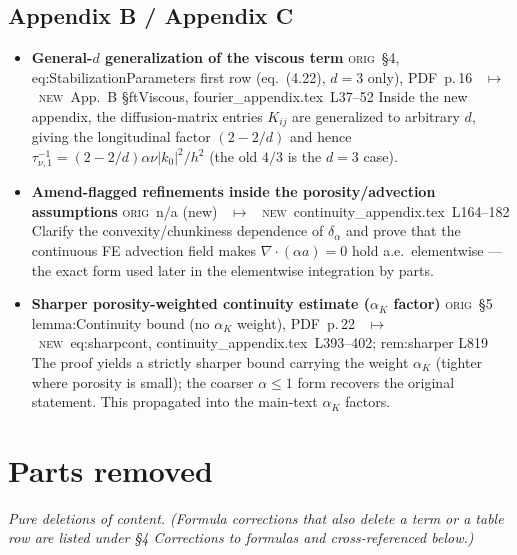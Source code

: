 \documentclass[11pt]{article}
\newcommand{\Orig}{\textcolor{origc}{\footnotesize\textsc{orig}}}
\newcommand{\New}{\textcolor{newc}{\footnotesize\textsc{new}}}
\newcommand{\code}[1]{\textcolor{newc}{\ttfamily\small #1}}
\newcommand{\pdfp}[1]{PDF~p.\,#1}
\newcommand{\appl}[2]{#1~L#2}          %
\newcommand{\ch}[4]{%
  \item \textbf{#1}\newline
    {\footnotesize\Orig\ #2 \ \textcolor{locc}{$\longmapsto$} \ \New\ #3}\newline
    #4}
\begin{document}
\subsection{Appendix B / Appendix C}
\begin{itemize}
\ch{General-$d$ generalization of the viscous term}
   {\S4, \code{eq:StabilizationParameters} first row (eq.~(4.22), $d{=}3$ only), \pdfp{16}}
   {App.~B \S ftViscous, \appl{fourier\_appendix.tex}{37}--52}
   {Inside the new appendix, the diffusion-matrix entries $K_{ij}$ are generalized to arbitrary $d$,
    giving the longitudinal factor $(2-2/d)$ and hence
    $\tau_{\nu,1}^{-1}=(2-2/d)\alpha\nu|k_0|^2/h^2$ (the old $4/3$ is the $d{=}3$ case).}
\ch{Amend-flagged refinements inside the porosity/advection assumptions}
   {n/a (new)}
   {\appl{continuity\_appendix.tex}{164}--182}
   {Clarify the convexity/chunkiness dependence of $\delta_\alpha$ and prove that the continuous FE
    advection field makes $\nabla\!\cdot\!(\alpha a)=0$ hold a.e.\ elementwise --- the exact form used
    later in the elementwise integration by parts.}
\ch{Sharper porosity-weighted continuity estimate ($\alpha_K$ factor)}
   {\S5 \code{lemma:Continuity} bound (no $\alpha_K$ weight), \pdfp{22}}
   {\code{eq:sharpcont}, \appl{continuity\_appendix.tex}{393}--402; \code{rem:sharper} L819}
   {The proof yields a strictly sharper bound carrying the weight $\alpha_K$ (tighter where porosity
    is small); the coarser $\alpha\le1$ form recovers the original statement. This propagated into the
    main-text $\alpha_K$ factors.}
\end{itemize}

\section{Parts removed}
\emph{Pure deletions of content. (Formula corrections that also delete a term or a table row are
listed under \S4 Corrections to formulas and cross-referenced below.)}
\end{document}
